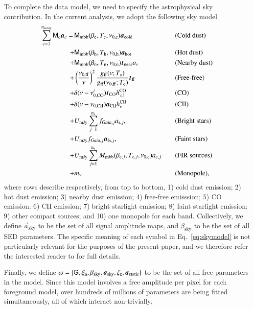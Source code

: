 \documentclass{aa}
\renewcommand{\t}[0]{\vec{t}}
\newcommand{\G}[0]{\tens{G}}
\renewcommand{\a}[0]{\vec{a}}
\newcommand{\M}[0]{\tens{M}}
\newcommand{\Te}[0]{T_{\rm e}}
\def\Tcold{\ifmmode T_\mathrm{c}\else $T_{\mathrm{c}}$\fi}
\def\Thot{\ifmmode T_\mathrm{h}\else $T_{\mathrm{h}}$\fi}
\def\Tnear{\ifmmode T_\mathrm{n}\else $T_{\mathrm{n}}$\fi}
\def\bcold{\ifmmode \beta_\mathrm{c}\else $\beta_{\mathrm{c}}$\fi}
\def\bhot{\ifmmode \beta_\mathrm{h}\else $\beta_{\mathrm{h}}$\fi}
\def\bnear{\ifmmode \beta_\mathrm{n}\else $\beta_{\mathrm{n}}$\fi}
\def\nuzeroff{\ifmmode \nu_{0,\mathrm{ff}}\else $\nu_{0,\mathrm{ff}}$\fi}
\def\nuzerocold{\ifmmode \nu_{0,\mathrm{c}}\else $\nu_{0,\mathrm{c}}$\fi}
\def\nuzerohot{\ifmmode \nu_{0,\mathrm{h}}\else $\nu_{0,\mathrm{h}}$\fi}
\def\nuzeronear{\ifmmode \nu_{0,\mathrm{n}}\else $\nu_{0,\mathrm{n}}$\fi}
\def\Te{\ifmmode T_{\mathrm{e}}\else $T_{\mathrm{e}}$\fi}
\begin{document}
To complete the data model, we need to specify the astrophysical sky
contribution. In the current analysis, we adopt the following sky model
\begin{alignat}{4}
  \sum_{c=1}^{n_{\mathrm{comp}}} \M_c \a_c  = \,
  &\M_{\mathrm{mbb}}(\bcold,\Tcold,\nuzerocold)\vec{a}_{\mathrm{cold}}
  && \textrm{(Cold dust)}\label{eq:skymodel}\\
  + &\M_{\mathrm{mbb}}(\bhot,\Thot,\nuzerohot)
  \vec{a}_{\mathrm{hot}} && \textrm{(Hot dust)}\nonumber \\
  + &\M_{\mathrm{mbb}}(\bnear,\Tnear,\nuzeronear) \t_{\mathrm{near}}
  a_{\nu} && \textrm{(Nearby dust)} \nonumber \\
  + &\left(\frac{\nuzeroff}{\nu}\right)^2
  \frac{g_{\mathrm{ff}}(\nu;\Te) }{g_{\mathrm{ff}}(\nuzeroff;\Te)}
  \vec{t}_{\mathrm{ff}} && \textrm{(Free-free)} \nonumber\\
  + &\delta(\nu-\nu_{0,\mathrm{CO}}^i) \t_{\mathrm{CO}}
  h^{\mathrm{CO}}_{\nu,i} && \textrm{(CO)}\nonumber\\
  + &\delta(\nu-\nu_{0,\mathrm{CII}}) \a_{\mathrm{CII}}
  h^{\mathrm{CII}}_{\nu} && \textrm{(CII)}\nonumber \\
  + &U_{\mathrm{mJy}} \sum_{j=1}^{n_{\mathrm{s}}}
  f_{\mathit{Gaia},j} a_{\mathrm{s},j}, &\quad&
  \textrm{(Bright stars)} \nonumber\\
  + &U_{\mathrm{mJy}} f_{\mathit{Gaia},j} \a_{\mathrm{fs},j}, &\quad&
  \textrm{(Faint stars)} \nonumber\\  
    + &U_{\mathrm{mJy}} \sum_{j=1}^{n_{\mathrm{e}}}
  M_{\mathrm{mbb}}(\beta_{\mathrm{e},j},
  T_{\mathrm{e},j}, \nu_{0,\mathrm{e}})
  a_{\mathrm{e},j} && \textrm{(FIR sources)}\nonumber\\
  + &m_{\nu} && \textrm{(Monopole)}, \nonumber
\end{alignat}
where rows describe respectively, from top to bottom, 1) cold dust
emission; 2) hot dust emission; 3) nearby dust emission; 4) free-free
emisssion; 5) CO emission; 6) CII emission; 7) bright starlight
emission; 8) faint starlight emission; 9) other compact sources; and
10) one monopole for each band. Collectively, we define
$\a_{\mathrm{sky}}$ to be the set of all signal amplitude maps, and
$\beta_{\mathrm{sky}}$ to be the set of all SED parameters. The
specific meaning of each symbol in Eq.~\eqref{eq:skymodel} is not
particularly relevant for the purposes of the present paper, and we
therefore refer the interested reader to \citet{CG02_04,CG02_05} for
full details.


Finally, we define $\omega = \{\G,\xi_{\mathrm{n}},
\beta_{\mathrm{sky}},\a_{\mathrm{sky}},\zeta_{\mathrm{z}},\a_{\mathrm{static}}\}$
to be the set of all free parameters in the model. Since this model involves
a free amplitude per pixel for each foreground model, over
hundreds of millions of parameters are being fitted simultaneously,
all of which interact non-trivially.
\end{document}
